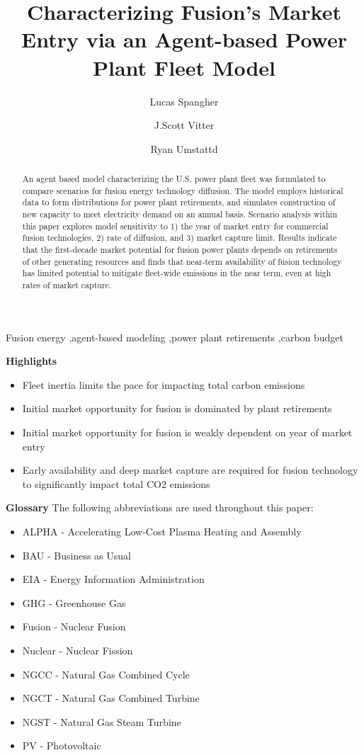 \documentclass[preprint, 12pt]{elsarticle}
\author[lucas]{Lucas Spangher\corref{}}
\author[scott]{J.Scott Vitter}
\author[ryan]{Ryan Umstattd}
\title{Characterizing Fusion’s Market Entry via an Agent-based Power Plant Fleet Model}
\begin{document}
\begin{frontmatter}
\begin{abstract}

An agent based model characterizing the U.S. power plant fleet was formulated to compare scenarios for fusion energy technology diffusion. The model employs historical data to form distributions for power plant retirements, and simulates construction of new capacity to meet electricity demand on an annual basis. Scenario analysis within this paper explores model sensitivity to 1) the year of market entry for commercial fusion technologies, 2) rate of diffusion, and 3) market capture limit. Results indicate that the first-decade market potential for fusion power plants depends on retirements of other generating resources and finds that near-term availability of fusion technology has limited potential to mitigate fleet-wide emissions in the near term, even at high rates of market capture.  

\end{abstract}

\begin{keyword}

Fusion energy \sep agent-based modeling \sep power plant retirements \sep carbon budget

\end{keyword}



\end{frontmatter}

\textbf{Highlights}
\begin{itemize}
\item Fleet inertia limits the pace for impacting total carbon emissions
\item Initial market opportunity for fusion is dominated by plant retirements 
\item Initial market opportunity for fusion is weakly dependent on year of market entry
\item Early availability and deep market capture  are required for fusion technology to significantly impact total CO2 emissions
\end{itemize}

\textbf{Glossary}
The following abbreviations are used throughout this paper:
\begin{itemize}

\item ALPHA - Accelerating Low-Cost Plasma Heating and Assembly
\item BAU - Business as Usual
\item EIA - Energy Information Administration 
\item GHG - Greenhouse Gas 
\item Fusion - Nuclear Fusion 
\item Nuclear - Nuclear Fission
\item NGCC - Natural Gas Combined Cycle
\item NGCT - Natural Gas Combined Turbine
\item NGST - Natural Gas Steam Turbine
\item PV - Photovoltaic

\end{itemize}
\end{document}
